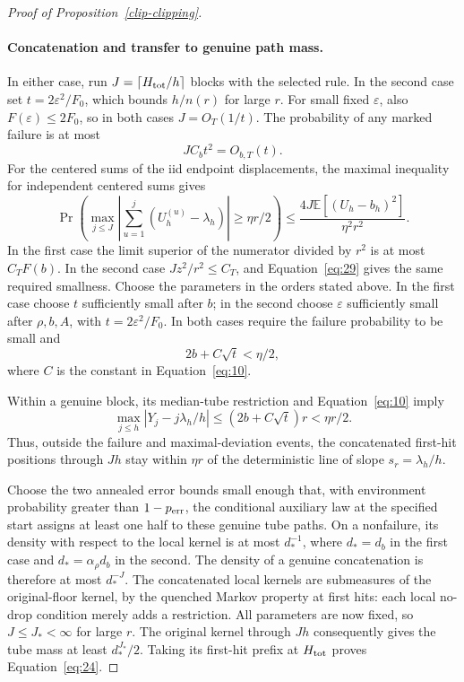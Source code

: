 \begin{proof}[Proof of Proposition~\ref{clip-clipping}]
\paragraph{Concatenation and transfer to genuine path mass.}
In either case, run \(J=\lceil H_{\rm tot}/h\rceil\) blocks with
the selected rule. In the second case set
\(t=2\varepsilon^2/F_0\), which bounds \(h/n(r)\) for large \(r\).
For small fixed \(\varepsilon\), also
\(F(\varepsilon)\le2F_0\), so in both cases
\(J=O_T(1/t)\). The probability of any marked failure is at most
\[
J C_bt^2=O_{b,T}(t).
\]
For the centered sums of the iid endpoint displacements, the maximal inequality for independent centered sums gives
\[
\Pr\left(\max_{j\le J}
 \left|\sum_{u=1}^j(U_h^{(u)}-\lambda_h)\right|
                       \ge\eta r/2\right)
\le \frac{4J\mathbb E[(U_h-b_h)^2]}{\eta^2r^2}.
\]
In the first case the limit superior of the numerator divided by
\(r^2\) is at most \(C_TF(b)\). In the second case
\(Jz^2/r^2\le C_T\), and Equation~\eqref{eq:29} gives the same
required smallness. Choose the parameters in the orders stated above. In the first case
choose \(t\) sufficiently small after \(b\); in the second choose
\(\varepsilon\) sufficiently small after \(\rho,b,A\), with
\(t=2\varepsilon^2/F_0\). In both cases require the failure probability
to be small and
\[
2b+C\sqrt t<\eta/2,
\]
where \(C\) is the constant in Equation~\eqref{eq:10}.

Within a genuine block, its median-tube restriction and
Equation~\eqref{eq:10} imply
\[
\max_{j\le h}|Y_j-j\lambda_h/h|
 \le (2b+C\sqrt t)r<\eta r/2.
\]
Thus, outside the failure and maximal-deviation events, the concatenated
first-hit positions through \(Jh\) stay within \(\eta r\) of the
deterministic line of slope \(s_r=\lambda_h/h\).

Choose the two annealed error bounds small enough that, with environment
probability greater than \(1-p_{\rm err}\), the conditional auxiliary
law at the specified start assigns at least one half to these genuine
tube paths. On a nonfailure, its density with respect to the local
kernel is at most \(d_*^{-1}\), where
\(d_*=d_b\) in the first case and
\(d_*=\alpha_\rho d_b\) in the second. The density of a genuine
concatenation is therefore at most \(d_*^{-J}\).
The concatenated local kernels are submeasures of the original-floor
kernel, by the quenched Markov property at first hits: each local
no-drop condition merely adds a restriction. All parameters are now
fixed, so \(J\le J_*<\infty\) for large \(r\). The original kernel
through \(Jh\) consequently gives the tube mass at least
\(d_*^{J_*}/2\). Taking its first-hit prefix at \(H_{\rm tot}\)
proves Equation~\eqref{eq:24}.
\end{proof}
